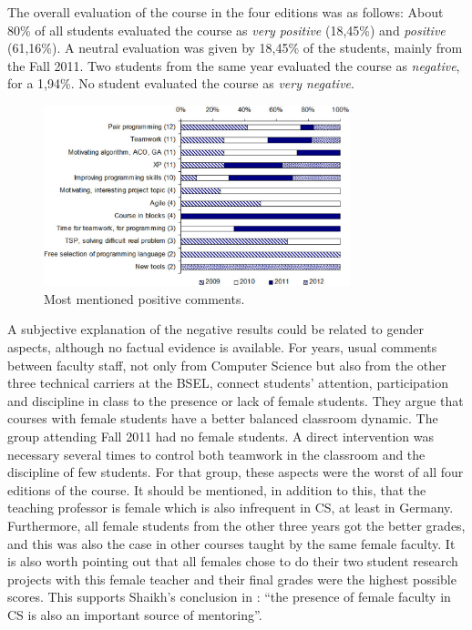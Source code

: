 \documentclass[conference]{IEEEtran}
\begin{document}
The overall evaluation of the course in the four editions was as follows: About 80\% of all students evaluated the course as \textit{very positive} (18,45\%) and \textit{positive} (61,16\%). A neutral evaluation was given by 18,45\% of the students, mainly from the Fall 2011. Two students from the same year evaluated the course as \textit{negative}, for a 1,94\%. No student evaluated the course as \textit{very negative}.

\begin{figure}[!t]
\centering
\includegraphics[width=8.9cm]{Resources/horizontalBars.pdf}
\caption{Most mentioned positive comments.}
\label{fig:horiz}
\end{figure}

A subjective explanation of the negative results could be related to gender aspects, although no factual evidence is available. For years, usual comments between faculty staff, not only from Computer Science but also from the other three technical carriers at the BSEL, connect students' attention, participation and discipline in class to the presence or lack of female students. They argue that courses with female students have a better balanced classroom dynamic. The group attending Fall 2011 had no female students. A direct intervention was necessary several times to control both teamwork in the classroom and the discipline of few students. For that group, these aspects were the worst of all four editions of the course. It should be mentioned, in addition to this, that the teaching professor is female which is also infrequent in CS, at least in Germany. Furthermore, all female students from the other three years got the better grades, and this was also the case in other courses taught by the same female faculty. It is also worth pointing out that all females chose to do their two student research projects with this female teacher and their final grades were the highest possible scores. This supports Shaikh's conclusion in \cite{Sh08}: ``the presence of female faculty in CS is also an important source of mentoring''.
\end{document}
